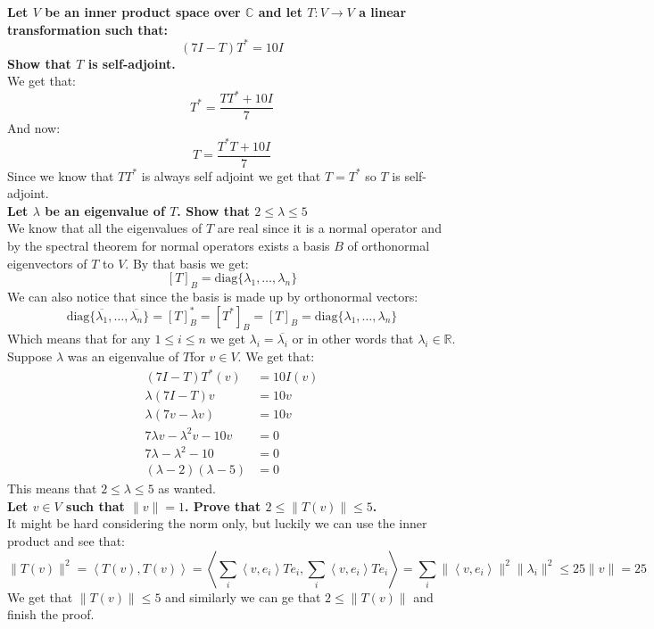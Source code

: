 \documentclass[11pt,a4paper]{article}
\theoremstyle{plain}
\newcommand{\R}{\mathbb{R}}
\newcommand{\C}{\mathbb{C}}
\newcommand{\ip}[2]{\left\langle #1, #2 \right\rangle}
\begin{document}
	\newpage
	\noindent
	\textbf{Let $V$ be an inner product space over $\C$ and let 
	$T \colon V \to V$ a linear transformation such that:
	\[
		(7I - T)T^* = 10I
	\]
	Show that $T$ is self-adjoint.} \\
	We get that:
	\[
		T^* = \frac{TT^* + 10I}{7}
	\]
	And now:
	\[
		T = \frac{T^*T + 10I}{7}
	\]
	Since we know that $TT^*$ is always self adjoint we get that $T = T^*$ so
	$T$ is self-adjoint. \\
	\textbf{Let $\lambda$ be an eigenvalue of $T$. Show that 
	$2 \le \lambda \le 5$} \\
	We know that all the eigenvalues of $T$ are real since it is a normal 
	operator and by the spectral theorem for normal operators exists a basis
	$B$ of orthonormal eigenvectors of $T$ to $V$. By that basis we get:
	\[
		[T]_B = \mathrm{diag}\{\lambda_1,\dots,\lambda_n\}
	\]
	We can also notice that since the basis is made up by orthonormal vectors:
	\[
		\mathrm{diag}\{\overline{\lambda_1},\dots,\overline{\lambda_n}\} =
		[T]^*_B = [T^*]_B = [T]_B = 
		\mathrm{diag}\{\lambda_1,\dots,\lambda_n\}
	\]
	Which means that for any $1 \le i \le n$ we get 
	$\lambda_i = \overline{\lambda_i}$ or in other words that $\lambda_i\in\R$.
	Suppose $\lambda$ was an eigenvalue of $T$for $v\in V$. We get that:
	\begin{align*}
		(7I - T)T^*(v) &= 10I(v) \\
		\lambda (7I - T)v &= 10v \\
		\lambda (7v - \lambda v) &= 10v \\
		7\lambda v - \lambda^2 v - 10v &= 0 \\
		7\lambda - \lambda^2  - 10 &= 0 \\
		(\lambda - 2)(\lambda - 5) &= 0
	\end{align*}
	This means that $2 \le \lambda \le 5$ as wanted. \\
	\textbf{Let $v \in V$ such that $\|v\| = 1$. Prove that 
	$2 \le \|T(v)\| \le 5$.} \\
	It might be hard considering the norm only, but luckily we can use the inner
	product and see that:
	\[
		\|T(v)\|^2 = \ip{T(v)}{T(v)} = 
		\ip{\sum_{i}{\ip{v}{e_i}Te_i}}{\sum_{i}{\ip{v}{e_i}Te_i}} = 
		\sum_{i}{\|\ip{v}{e_i}\|^2\|\lambda_i\|^2} \le 
		25 \|v\| = 25
	\]
	We get that $\|T(v)\| \le 5$ and similarly we can ge that $2 \le \|T(v)\|$
	and finish the proof.
	
\end{document}
